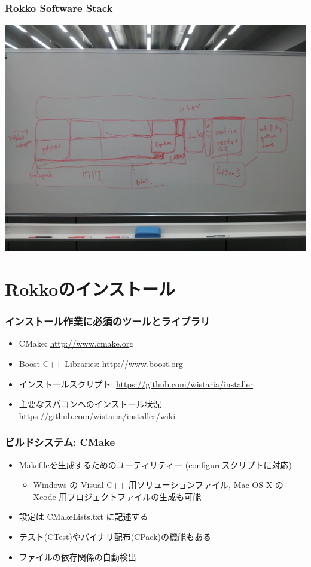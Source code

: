 \begin{frame}
  \frametitle{Rokko Software Stack}
  \begin{center}
    \includegraphics[height=0.8\textheight]{figure/rokko-software-stack.jpg}
  \end{center}
\end{frame}

\section{Rokkoのインストール}

\begin{frame}
  \frametitle{インストール作業に必須のツールとライブラリ}
  \begin{itemize}
    \setlength{\itemsep}{1em}
  \item CMake: \url{http://www.cmake.org}
  \item Boost C++ Libraries: \url{http://www.boost.org}
  \item インストールスクリプト: \url{https://github.com/wistaria/installer}
  \item 主要なスパコンへのインストール状況 \\
    \url{https://github.com/wistaria/installer/wiki}
  \end{itemize}
\end{frame}

\begin{frame}
  \frametitle{ビルドシステム: CMake}
  \begin{itemize}
    \setlength{\itemsep}{1em}
  \item Makefileを生成するためのユーティリティー (configureスクリプトに対応)
    \begin{itemize}
    \item Windows の Visual C++ 用ソリューションファイル, Mac OS X の Xcode 用プロジェクトファイルの生成も可能
    \end{itemize}
  \item 設定は CMakeLists.txt に記述する
  \item テスト(CTest)やバイナリ配布(CPack)の機能もある
  \item ファイルの依存関係の自動検出
  \end{itemize}
\end{frame}

